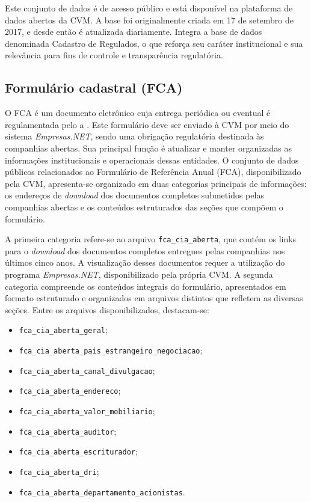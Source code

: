 \documentclass[recuosum=1.5cm]{iftex2024}
\begin{document}
Este conjunto de dados é de acesso público e está disponível na plataforma de dados abertos da CVM. A base foi originalmente criada em 17 de setembro de 2017, e desde então é atualizada diariamente. Integra a base de dados denominada Cadastro de Regulados, o que reforça seu caráter institucional e sua relevância para fins de controle e transparência regulatória.

\subsection{Formulário cadastral (FCA)}
O FCA é um documento eletrônico cuja entrega periódica ou eventual é regulamentada pelo a \citet{cvm:2022:resolucao}. Este formulário deve ser enviado à CVM por meio do sistema \textit{Empresas.NET}, sendo uma obrigação regulatória destinada às companhias abertas. Sua principal função é atualizar e manter organizadas as informações institucionais e operacionais dessas entidades. O conjunto de dados públicos relacionados ao Formulário de Referência Anual (FCA), disponibilizado pela CVM, apresenta-se organizado em duas categorias principais de informações: os endereços de \textit{download} dos documentos completos submetidos pelas companhias abertas e os conteúdos estruturados das seções que compõem o formulário.

A primeira categoria refere-se ao arquivo \texttt{fca\_cia\_aberta}, que contém os links para o \textit{download} dos documentos completos entregues pelas companhias nos últimos cinco anos. A visualização desses documentos requer a utilização do programa \textit{Empresas.NET}, disponibilizado pela própria CVM. A segunda categoria compreende os conteúdos integrais do formulário, apresentados em formato estruturado e organizados em arquivos distintos que refletem as diversas seções. Entre os arquivos disponibilizados, destacam-se: 
\begin{itemize}
	\item \texttt{fca\_cia\_aberta\_geral};
	\item \texttt{fca\_cia\_aberta\_pais\_estrangeiro\_negociacao};
	\item \texttt{fca\_cia\_aberta\_canal\_divulgacao};
	\item \texttt{fca\_cia\_aberta\_endereco};
	\item \texttt{fca\_cia\_aberta\_valor\_mobiliario};
	\item \texttt{fca\_cia\_aberta\_auditor};
	\item \texttt{fca\_cia\_aberta\_escriturador};
	\item \texttt{fca\_cia\_aberta\_dri};
	\item \texttt{fca\_cia\_aberta\_departamento\_acionistas}. 
\end{itemize}
\end{document}
